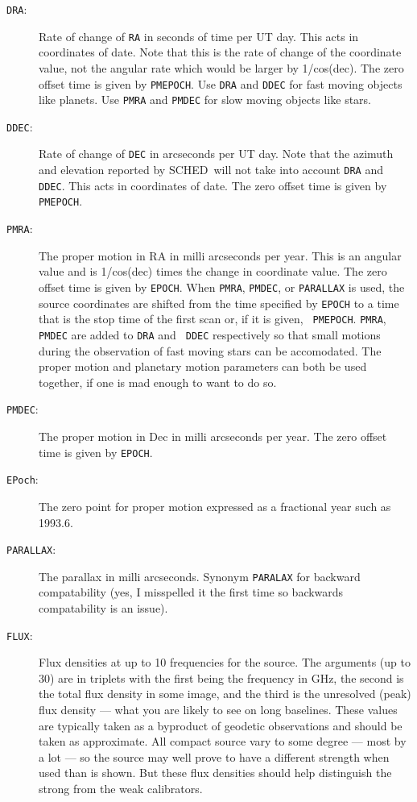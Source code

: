 \documentclass{report}
\newcommand{\schedb}{{\sc SCHED~}}
\begin{document}
\begin{description}
\item [{\tt DRA}:] Rate of change of {\tt RA} in seconds of time per
UT day.  This acts in coordinates of date.  Note that this is the
rate of change of the coordinate value, not the angular rate which
would be larger by 1/cos(dec).  The zero offset time is given by
{\tt PMEPOCH}.  Use {\tt DRA} and {\tt DDEC} for fast moving objects
like planets.  Use {\tt PMRA} and {\tt PMDEC} for slow moving
objects like stars.

\item [{\tt DDEC}:] Rate of change of {\tt DEC} in arcseconds per UT
day. Note that the azimuth and elevation reported by \schedb will not
take into account {\tt DRA} and {\tt DDEC}. This acts in coordinates
of date.  The zero offset time is given by {\tt PMEPOCH}.

\item [{\tt PMRA}:] The proper motion in RA in milli arcseconds per year.
This is an angular value and is 1/cos(dec) times the change in
coordinate value.  The zero offset time is given by {\tt EPOCH}.  When
{\tt PMRA}, {\tt PMDEC}, or {\tt PARALLAX} is used, the source
coordinates are shifted from the time specified by {\tt EPOCH} to a
time that is the stop time of the first scan or, if it is given, {\tt
PMEPOCH}.  {\tt PMRA}, {\tt PMDEC} are added to {\tt DRA} and {\tt
DDEC} respectively so that small motions during the observation of
fast moving stars can be accomodated.  The proper motion and planetary
motion parameters can both be used together, if one is mad enough
to want to do so.

\item [{\tt PMDEC}:] The proper motion in Dec in milli arcseconds per year.
The zero offset time is given by {\tt EPOCH}.

\item [{\tt EPoch}:] The zero point for proper motion expressed as
a fractional year such as 1993.6.

\item [{\tt PARALLAX}:] The parallax in milli arcseconds.  Synonym
{\tt PARALAX} for backward compatability (yes, I misspelled it the first
time so backwards compatability is an issue).

\item [{\tt FLUX}:] Flux densities at up to 10 frequencies for the
source.  The arguments (up to 30) are in triplets with the first being
the frequency in GHz, the second is the total flux density in some
image, and the third is the unresolved (peak) flux density --- what
you are likely to see on long baselines.  These values are typically
taken as a byproduct of geodetic observations and should be taken as
approximate.  All compact source vary to some degree --- most by a lot
--- so the source may well prove to have a different strength when
used than is shown.  But these flux densities should help distinguish
the strong from the weak calibrators.


\end{description}
\end{document}

